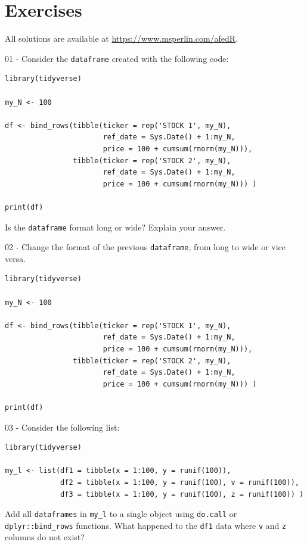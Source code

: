 \documentclass[
  12pt,
]{book}
\begin{document}
\hypertarget{exercises-8}{%
\section{Exercises}\label{exercises-8}}

All solutions are available at \url{https://www.msperlin.com/afedR}.

01 -
Consider the \texttt{dataframe} created with the following code:

\begin{verbatim}
library(tidyverse)

my_N <- 100

df <- bind_rows(tibble(ticker = rep('STOCK 1', my_N),
                       ref_date = Sys.Date() + 1:my_N,
                       price = 100 + cumsum(rnorm(my_N))),
                tibble(ticker = rep('STOCK 2', my_N),
                       ref_date = Sys.Date() + 1:my_N,
                       price = 100 + cumsum(rnorm(my_N))) )

print(df)
\end{verbatim}

Is the \texttt{dataframe} format long or wide? Explain your answer.

02 -
Change the format of the previous \texttt{dataframe}, from long to wide or vice versa.

\begin{verbatim}
library(tidyverse)

my_N <- 100

df <- bind_rows(tibble(ticker = rep('STOCK 1', my_N),
                       ref_date = Sys.Date() + 1:my_N,
                       price = 100 + cumsum(rnorm(my_N))),
                tibble(ticker = rep('STOCK 2', my_N),
                       ref_date = Sys.Date() + 1:my_N,
                       price = 100 + cumsum(rnorm(my_N))) )

print(df)
\end{verbatim}

03 -
Consider the following list:

\begin{verbatim}
library(tidyverse)

my_l <- list(df1 = tibble(x = 1:100, y = runif(100)),
             df2 = tibble(x = 1:100, y = runif(100), v = runif(100)),
             df3 = tibble(x = 1:100, y = runif(100), z = runif(100)) )
\end{verbatim}

Add all \texttt{dataframes} in \texttt{my\_l} to a single object using \texttt{do.call} or \texttt{dplyr::bind\_rows} functions. What happened to the \texttt{df1} data where \texttt{v} and \texttt{z} columns do not exist?
\end{document}
